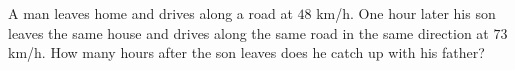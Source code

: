 A man leaves home and drives along a road at $48$ km/h. One hour later his son leaves the same house and drives along the same road in the same direction at $73$ km/h. How many hours after the son leaves does he catch up with his father?
